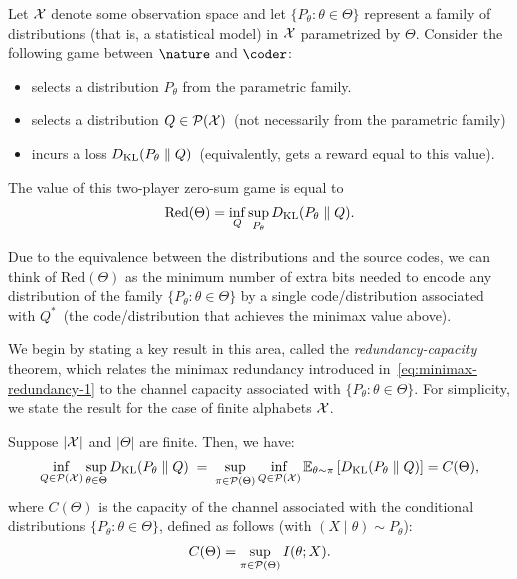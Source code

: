\documentclass[12pt]{article}
\begin{document}
Let ${\cal X}$ denote some observation space and let $\{P_\theta:\theta \in \Theta\}$ represent a family of distributions (that is, a statistical model) in ${\cal X}$ parametrized by $\Theta$. Consider the following game between $\nature$ and $\coder$: 
\begin{itemize}
    \item \nature selects a distribution $P_\theta$ from the parametric family.
    \item \coder selects a distribution $Q \in {\cal P}({\cal X})$~(not necessarily from the parametric family)
    \item \coder incurs a loss $D_{\text{KL}}(P_\theta \parallel Q)$~(equivalently, \nature gets a reward equal to this value). 
\end{itemize}
The value of this two-player zero-sum game is equal to 
\begin{align}
    \mathrm{Red}(\Theta) = \inf_{Q} \sup_{P_\theta} D_{\text{KL}}(P_\theta \parallel Q). \label{eq:minimax-redundancy-1}
\end{align}
\begin{remark}
    Due to the equivalence between the distributions and the source codes, we can think of $\mathrm{Red}(\Theta)$ as the minimum number of extra bits needed to encode any distribution of the family $\{P_\theta: \theta \in \Theta\}$ by a single code/distribution associated with $Q^*$~(the code/distribution that achieves the minimax value above). 
\end{remark}
We begin by stating a key result in this area, called the \emph{redundancy-capacity} theorem, which relates the minimax redundancy introduced in~\eqref{eq:minimax-redundancy-1} to the channel capacity associated with $\{P_\theta: \theta \in \Theta\}$. For simplicity, we state the result for the case of finite alphabets ${\cal X}$. 
% 
\begin{theorem}
    \label{theorem:redundancy-capacity} Suppose $|{\cal X}|$ and $|\Theta|$ are finite. Then, we have: 
    \begin{align}
        \inf_{Q \in {\cal P}({\cal X})}\sup_{\theta \in \Theta} D_{\text{KL}}(P_\theta \parallel Q) \; = \; 
        \sup_{\pi \in {\cal P}(\Theta)} \inf_{Q \in {\cal P}({\cal X})} \mathbb{E}_{\theta \sim \pi}\left[ D_{\text{KL}}(P_\theta \parallel Q)\right] = C(\Theta), 
    \end{align}
    where $C(\Theta)$ is the capacity of the channel associated with the conditional distributions $\{P_\theta: \theta \in \Theta\}$, defined as follows (with $(X \mid \theta) \sim P_\theta$):
    \begin{align}
        C(\Theta) = \sup_{\pi \in {\cal P}(\Theta)} I(\theta; X). 
    \end{align}
\end{theorem}
% 
\end{document}
